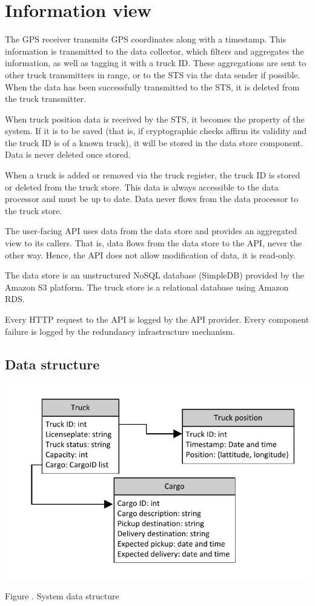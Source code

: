 \documentclass[a4paper,11pt]{report}
\newcommand{\mycaption}[1]{
  \addtocounter{figures}{1}
  Figure \arabic{figures}. #1
}
\begin{document}
\section{Information view}
\label{cha:information-view}


The GPS receiver transmits GPS coordinates along with a timestamp.
This information is transmitted to the data collector, which filters
and aggregates the information, as well as tagging it with a truck ID.
These aggregations are sent to other truck transmitters in range, or
to the STS via the data sender if possible.  When the data has been
successfully transmitted to the STS, it is deleted from the truck
transmitter.

When truck position data is received by the STS, it becomes the
property of the system.  If it is to be saved (that is, if
cryptographic checks affirm its validity and the truck ID is of a
known truck), it will be stored in the data store component.  Data is
never deleted once stored.

When a truck is added or removed via the truck register, the truck ID
is stored or deleted from the truck store.  This data is always
accessible to the data processor and must be up to date.  Data never
flows from the data processor to the truck store.

The user-facing API uses data from the data store and provides an
aggregated view to its callers.  That is, data flows from the data
store to the API, never the other way.  Hence, the API does not allow
modification of data, it is read-only.

The data store is an unstructured NoSQL database (SimpleDB) provided
by the Amazon S3 platform.  The truck store is a relational database
using Amazon RDS.

Every HTTP request to the API is logged by the API provider.  Every
component failure is logged by the redundancy infrastructure
mechanism.

\subsection{Data structure}
\label{sec:data-structure}

\begin{center}
  \includegraphics[width=\textwidth]{figures/Data_structure}\\
  \mycaption{System data structure}
\end{center}
\end{document}
